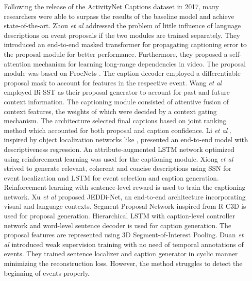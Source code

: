 \par Following the release of the ActivityNet Captions dataset in 2017, many researchers were able to surpass the results of the baseline model and achieve state-of-the-art. Zhou \textit{et al} \cite{zhou2018end} addressed the problem of little influence of language descriptions on event proposals if the two modules are trained separately. They introduced an end-to-end masked transformer for propagating captioning error to the proposal module for better performance. Furthermore, they proposed a self-attention mechanism for learning long-range dependencies in video. The proposal module was based on ProcNets \cite{zhou2017automatic}. The caption decoder employed a differentiable proposal mask to account for features in the respective event. Wang \textit{et al} \cite{wang2018bidirectional} employed Bi-SST as their proposal generator to account for past and future context information. The captioning module consisted of attentive fusion of context features, the weights of which were decided by a context gating mechanism. The architecture selected final captions based on joint ranking method which accounted for both proposal and caption confidence. Li \textit{et al} \cite{li2018jointly}, inspired by object localization networks like \cite{ren2016faster, liu2016ssd}, presented an end-to-end model with descriptiveness regression. An attribute-augmented LSTM network optimized using reinforcement learning was used for the captioning module. Xiong \textit{et al} \cite{xiong2018forward} strived to generate relevant, coherent and concise descriptions using SSN \cite{zhao2017temporal} for event localization and LSTM for event selection and caption generation. Reinforcement learning with sentence-level reward is used to train the captioning network. Xu \textit{et al} \cite{xu2018joint} proposed JEDDi-Net, an end-to-end architecture incorporating visual and language contexts. Segment Proposal Network inspired from R-C3D \cite{xu2017rc3d} is used for proposal generation. Hierarchical LSTM with caption-level controller network and word-level sentence decoder is used for caption generation. The proposal features are represented using 3D Segment-of-Interest Pooling. Duan \textit{et al} \cite{duan2018weakly} introduced weak supervision training with no need of temporal annotations of events. They trained sentence localizer and caption generator in cyclic manner minimizing the reconstruction loss. However, the method struggles to detect the beginning of events properly.

